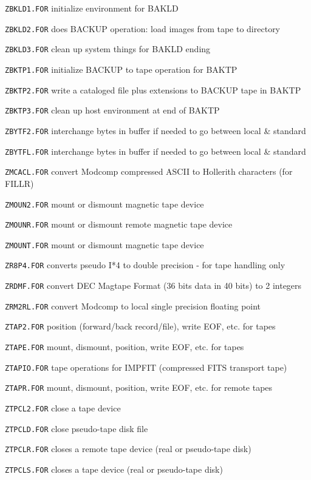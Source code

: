 {\medskip

\item{\tt ZBKLD1.FOR} initialize environment for BAKLD
\item{\tt ZBKLD2.FOR} does BACKUP operation: load images from tape to directory
\item{\tt ZBKLD3.FOR} clean up system things for BAKLD ending
\item{\tt ZBKTP1.FOR} initialize BACKUP to tape operation for BAKTP
\item{\tt ZBKTP2.FOR} write a cataloged file plus extensions to BACKUP tape in BAKTP
\item{\tt ZBKTP3.FOR} clean up host environment at end of BAKTP
\item{\tt ZBYTF2.FOR} interchange bytes in buffer if needed to go between local \& standard
\item{\tt ZBYTFL.FOR} interchange bytes in buffer if needed to go between local \& standard
\item{\tt ZMCACL.FOR} convert Modcomp compressed ASCII to Hollerith characters (for FILLR)
\item{\tt ZMOUN2.FOR} mount or dismount magnetic tape device
\item{\tt ZMOUNR.FOR} mount or dismount remote magnetic tape device
\item{\tt ZMOUNT.FOR} mount or dismount magnetic tape device
\item{\tt ZR8P4.FOR} converts pseudo I*4 to double precision - for tape handling only
\item{\tt ZRDMF.FOR} convert DEC Magtape Format (36 bits data in 40 bits) to 2 integers
\item{\tt ZRM2RL.FOR} convert Modcomp to local single precision floating point
\item{\tt ZTAP2.FOR} position (forward/back record/file), write EOF, etc. for tapes
\item{\tt ZTAPE.FOR} mount, dismount, position, write EOF, etc. for tapes
\item{\tt ZTAPIO.FOR} tape operations for IMPFIT (compressed FITS transport tape)
\item{\tt ZTAPR.FOR} mount, dismount, position, write EOF, etc. for remote tapes
\item{\tt ZTPCL2.FOR} close a tape device
\item{\tt ZTPCLD.FOR} close pseudo-tape disk file
\item{\tt ZTPCLR.FOR} closes a remote tape device (real or pseudo-tape disk)
\item{\tt ZTPCLS.FOR} closes a tape device (real or pseudo-tape disk)
}
